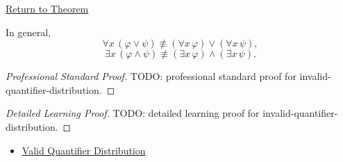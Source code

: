 \newpage
{}
\label{prf:invalid-quantifier-distribution}

\begin{remark*}[Return]
\hyperref[thm:invalid-quantifier-distribution]{Return to Theorem}
\end{remark*}

\begin{theorem*}
In general,
\[
\forall x\,(\varphi\lor\psi)
\not\equiv
(\forall x\,\varphi)\lor(\forall x\,\psi),
\]
\[
\exists x\,(\varphi\land\psi)
\not\equiv
(\exists x\,\varphi)\land(\exists x\,\psi).
\]
\end{theorem*}

\begin{proof}[Professional Standard Proof]
\LRAProofBodyStart
TODO: professional standard proof for invalid-quantifier-distribution.
\end{proof}

\begin{proof}[Detailed Learning Proof]
\LRAProofBodyStart
TODO: detailed learning proof for invalid-quantifier-distribution.
\end{proof}

\begin{remark*}
\end{remark*}

\begin{dependencies}
\begin{itemize}
  \item \hyperref[thm:qdist]{Valid Quantifier Distribution}
\end{itemize}
\end{dependencies}

\clearpage
